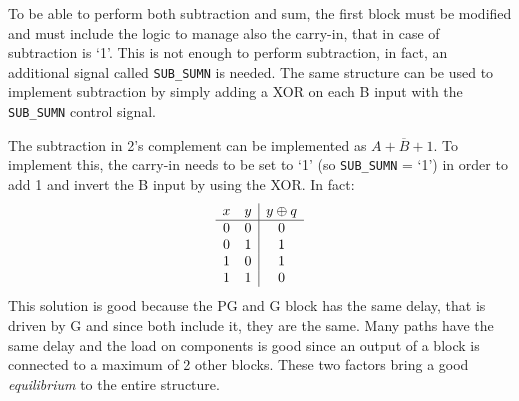 To be able to perform both subtraction and sum, the first block must be modified and must include the logic to manage also the carry-in, that in case of subtraction is `1'. This is not enough to perform subtraction, in fact, an additional signal called \texttt{SUB\_SUMN} is needed.
The same structure can be used to implement subtraction by simply adding a XOR on each B input with the \texttt{SUB\_SUMN} control signal.

The subtraction in 2's complement can be implemented as $A + \overline{B} + 1$. To implement this, the carry-in needs to be set to `1' (so \texttt{SUB\_SUMN} = `1') in order to add 1 and invert the B input by using the XOR. In fact:
\begin{displaymath}
    \begin{array}{c c|c}
        x & y & y \oplus q\\ %
        \hline %
        0 & 0 & 0\\
        0 & 1 & 1\\
        1 & 0 & 1\\
        1 & 1 & 0\\
    \end{array}
\end{displaymath}
This solution is good because the PG and G block has the same delay, that is driven by G and since both include it, they are the same. Many paths have the same delay and the load on components is good since an output of a block is connected to a maximum of 2 other blocks. These two factors bring a good \textit{equilibrium} to the entire structure.
